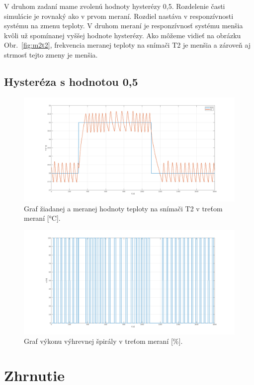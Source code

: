 \documentclass{article}
\begin{document}
V druhom zadaní mame zvolenú hodnoty hysterézy 0,5. Rozdelenie časti simulácie je rovnaký ako v prvom meraní.
Rozdiel nastáva v responzívnosti systému na zmenu teploty. V druhom meraní je responzívnosť systému menšia
kvôli už spomínanej vyššej hodnote hysterézy. Ako môžeme vidieť na obrázku Obr.~\ref{fig:m2t2}, frekvencia
meranej teploty na snímači T2 je menšia a zároveň aj strmosť tejto zmeny je menšia.

\subsection{Hysteréza s hodnotou 0,5}
\label{sec:meranie3}

\begin{figure}[!htbp]
	\begin{center}
		\includegraphics[width=\textwidth]{./include/m2T2.png}
	\end{center}
	\caption{Graf žiadanej a meranej hodnoty teploty na snímači T2 v treťom meraní [°C].}
	\label{fig:m3t2}
\end{figure}

\clearpage

\begin{figure}[!htbp]
	\begin{center}
		\includegraphics[width=\textwidth]{./include/m2u.png}
	\end{center}
	\caption{Graf výkonu výhrevnej špirály v treťom meraní [\%].}
	\label{fig:m3u}
\end{figure}

\section{Zhrnutie}
\label{sec:zhrnutie}
\end{document}
